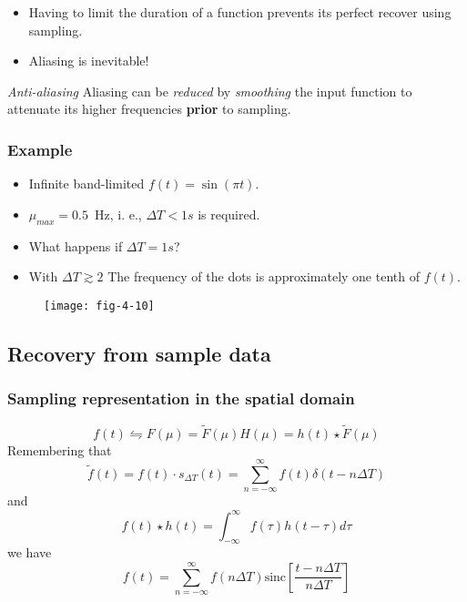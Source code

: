 
\begin{frame}
\begin{itemize}
\item Having to limit the duration of a function prevents its perfect recover using sampling.
\item Aliasing is inevitable!
\end{itemize}
\begin{block}{\textit{Anti-aliasing}}
Aliasing can be \textit{reduced} by \textit{smoothing} the input function to attenuate its higher frequencies \textbf{prior} to sampling.
\end{block}
\end{frame}


\begin{frame}
\frametitle{Example}
\begin{itemize}
\item Infinite band-limited $f(t)=\sin(\pi t)$.
\item $\mu_{max} = 0.5$~Hz, i. e., $\Delta T < 1s$ is required.
\item What happens if $\Delta T = 1s$?
\item With $\Delta T \gtrsim 2$ The frequency of the dots is approximately one tenth of $f(t)$.
\end{itemize}
\begin{figure}
\centering
\texttt{[image: fig-4-10]}
\end{figure}
\end{frame}


\subsection{Recovery from sample data}


\begin{frame}
\frametitle{Sampling representation in the spatial domain}
\begin{equation}
f (t) \leftrightharpoons F(\mu) = \tilde{F}(\mu) H(\mu) = h(t) \star \tilde{F}(\mu)
\end{equation}
Remembering that
\[
\tilde{f}(t) = f(t)\cdot s_{\Delta T} (t) =  \sum_{n=-\infty}^{\infty} f(t) \delta(t - n\Delta T)
\]
and
\[
f(t) \star h(t) = \int_{-\infty}^{\infty} f(\tau)h(t-\tau) d\tau
\]
we have
\begin{equation}
\boxed{
f(t) = \sum_{n=-\infty}^{\infty} f(n\Delta T) \text{sinc}\left [ \dfrac{t - n\Delta T}{n\Delta T} \right ]
}
\end{equation}
\end{frame}

